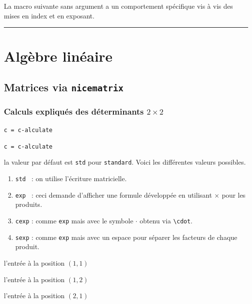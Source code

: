 \documentclass[12pt,a4paper]{book}
\newcommand\env[1]{\texttt{#1}}
\newcommand\macro[1]{\env{\textbackslash{}#1}}
\theoremstyle{definition}
\newcommand\separation{
	\medskip
	\hfill\rule{0.5\textwidth}{0.75pt}\hfill
	\medskip
}
\newcommand\extraspace{
	\vspace{0.25em}
}
\newcommand\mwhyprefix[2]{%
	\texttt{#1 = #1-#2}%
}
\begin{document}
{{La macro suivante sans argument a un comportement spécifique vis à vis des mises en index et en exposant. 


\separation







\section{Algèbre linéaire}

\subsection{Matrices via \texttt{nicematrix}}

\subsubsection{\texorpdfstring{Calculs expliqués des déterminants $2 \times 2$}%
                           {Calculs expliqués des déterminants 2x2}} \label{tnslinalg-2D-det}



 \hfill \mwhyprefix{c}{alculate}

 \hfill \mwhyprefix{c}{alculate}

\IDoption{} la valeur par défaut est \verb+std+ pour \verb+standard+. Voici les différentes valeurs possibles.
\begin{enumerate}
	\item \verb+std + : on utilise l'écriture matricielle.

	\item \verb+exp + : ceci demande d'afficher une formule développée en utilisant $\times$ pour les produits.

	\item \verb+cexp+ : comme \verb+exp+ mais avec le symbole $\cdot$ obtenu via \macro{cdot}.

	\item \verb+sexp+ : comme \verb+exp+ mais avec un espace pour séparer les facteurs de chaque produit.
\end{enumerate}

 l'entrée à la position $(1, 1)$

 l'entrée à la position $(1, 2)$

\extraspace

 l'entrée à la position $(2, 1)$

}}
\end{document}
